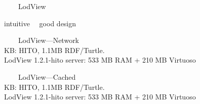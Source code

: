 \documentclass[14pt,aspectratio=169]{beamer}
\newcommand{\cmark}{\ding{51}}%
\newcommand{\xmark}{\ding{55}}%
\newcommand{\imageslide}[4][]
{
\begin{frame}[plain]{~~~~#2}
\vspace{0.2em}
\centering\makebox[\linewidth]{\texttt{[image: \#3]}}
\\#1
\note{#4}
\end{frame}
}
\begin{document}
\begin{frame}[plain]{~~~~LodView}

\vspace{0.2em}
\centering{}
\footnotesize
intuitive \cmark{}~~good design \cmark{}
%
\end{frame}

\imageslide[KB: HITO, 1.1MB RDF/Turtle.\\LodView 1.2.1-hito server: 533 MB RAM + 210 MB Virtuoso]{LodView---Network}{img/lodview-nocache.png}{}
\imageslide[KB: HITO, 1.1MB RDF/Turtle.\\LodView 1.2.1-hito server: 533 MB RAM + 210 MB Virtuoso]{LodView---Cached}{img/lodview-cache.png}{}
\end{document}
